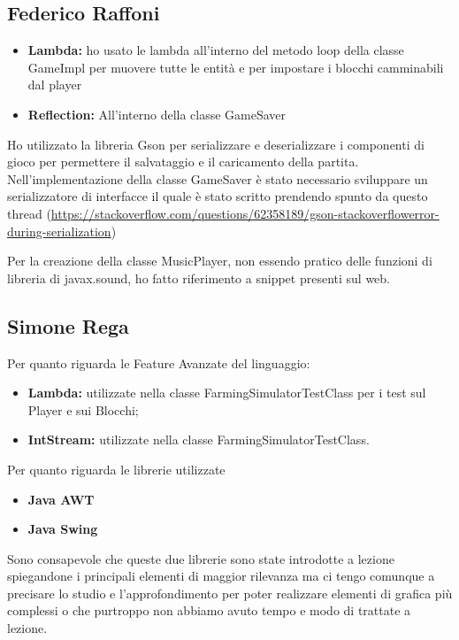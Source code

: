 \documentclass[a4paper,12pt]{report}
\begin{document}
\subsection{Federico Raffoni}

\begin{itemize}
	\item \textbf{Lambda:} ho usato le lambda all’interno del metodo loop della classe GameImpl per muovere tutte le entità e per impostare i blocchi camminabili dal player
	\item\textbf{Reflection:} All’interno della classe GameSaver
\end{itemize}

Ho utilizzato la libreria Gson per serializzare e deserializzare i componenti di gioco per permettere il salvataggio e il caricamento della partita.
Nell’implementazione della classe GameSaver è stato necessario sviluppare un serializzatore di interfacce il quale è stato scritto prendendo spunto da questo thread (\url{https://stackoverflow.com/questions/62358189/gson-stackoverflowerror-during-serialization})

Per la creazione della classe MusicPlayer, non essendo pratico delle funzioni di libreria di javax.sound, ho fatto riferimento a snippet presenti sul web.


\subsection{Simone Rega}
Per quanto riguarda le Feature Avanzate del linguaggio: 
\begin{itemize}
	\item \textbf{Lambda: }utilizzate nella classe FarmingSimulatorTestClass per i test sul Player e sui Blocchi;	
	\item \textbf{IntStream: }utilizzate nella classe FarmingSimulatorTestClass.
\end{itemize}

\hfill\break
Per quanto riguarda le librerie utilizzate
\begin{itemize}
	\item \textbf{Java AWT }
	\item \textbf{Java Swing}
\end{itemize}
Sono consapevole che queste due librerie sono state introdotte a lezione spiegandone i principali elementi di maggior rilevanza ma ci tengo comunque a precisare lo studio e l'approfondimento per poter realizzare elementi di grafica più complessi o che purtroppo non abbiamo avuto tempo e  modo di trattate a lezione.
 
\end{document}
